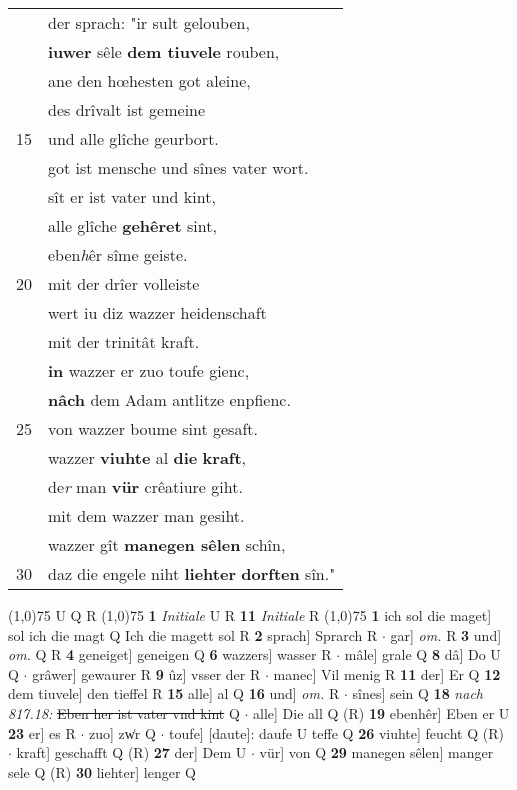 \documentclass[8pt,a4paper,notitlepage]{article}
\begin{document}
\begin{table}[ht]
\begin{minipage}[t]{0.5\linewidth}
\begin{tabular}{rl}
 & der sprach: "ir sult gelouben,\\ 
 & \textbf{iuwer} sêle \textbf{dem tiuvele} rouben,\\ 
 & ane den hœhesten got aleine,\\ 
 & des drîvalt ist gemeine\\ 
15 & und alle glîche geurbort.\\ 
 & got ist mensche und sînes vater wort.\\ 
 & sît er ist vater und kint,\\ 
 & alle glîche \textbf{gehêret} sint,\\ 
 & eben\textit{h}êr sîme geiste.\\ 
20 & mit der drîer volleiste\\ 
 & wert iu diz wazzer heidenschaft\\ 
 & mit der trinitât kraft.\\ 
 & \textbf{in} wazzer er zuo toufe gienc,\\ 
 & \textbf{nâch} dem Adam antlitze enpfienc.\\ 
25 & von wazzer boume sint gesaft.\\ 
 & wazzer \textbf{viuhte} al \textbf{die} \textbf{kraft},\\ 
 & de\textit{r} man \textbf{vür} crêatiure giht.\\ 
 & mit dem wazzer man gesiht.\\ 
 & wazzer gît \textbf{manegen sêlen} schîn,\\ 
30 & daz die engele niht \textbf{liehter} \textbf{dorften} sîn."\\ 
\end{tabular}
\scriptsize
\line(1,0){75} \newline
U Q R \newline
\line(1,0){75} \newline
\textbf{1} \textit{Initiale} U R  \textbf{11} \textit{Initiale} R  \newline
\line(1,0){75} \newline
\textbf{1} ich sol die maget] sol ich die magt Q Ich die magett sol R \textbf{2} sprach] Sprarch R  $\cdot$ gar] \textit{om.} R \textbf{3} und] \textit{om.} Q R \textbf{4} geneiget] geneigen Q \textbf{6} wazzers] wasser R  $\cdot$ mâle] grale Q \textbf{8} dâ] Do U Q  $\cdot$ grâwer] gewaurer R \textbf{9} ûz] vsser der R  $\cdot$ manec] Vil menig R \textbf{11} der] Er Q \textbf{12} dem tiuvele] den tieffel R \textbf{15} alle] al Q \textbf{16} und] \textit{om.} R  $\cdot$ sînes] sein Q \textbf{18} \textit{nach 817.18:} \sout{Eben her ist vater vnd kint} Q   $\cdot$ alle] Die all Q (R) \textbf{19} ebenhêr] Eben er U \textbf{23} er] es R  $\cdot$ zuo] zw͑r Q  $\cdot$ toufe] [daute]: daufe U teffe Q \textbf{26} viuhte] feucht Q (R)  $\cdot$ kraft] geschafft Q (R) \textbf{27} der] Dem U  $\cdot$ vür] von Q \textbf{29} manegen sêlen] manger sele Q (R) \textbf{30} liehter] lenger Q \newline
\end{minipage}
\end{table}
\end{document}
